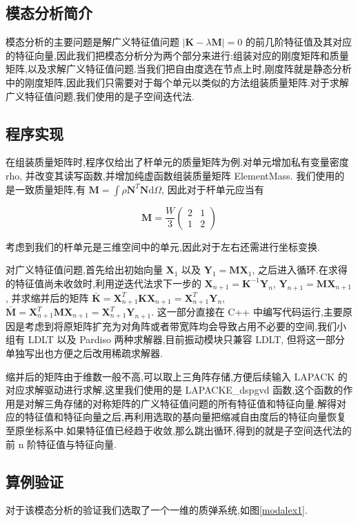 
\subsection{模态分析简介}
模态分析的主要问题是解广义特征值问题 $|\mathbf{K}-\lambda\mathbf{M}|=0$ 的前几阶特征值及其对应的特征向量,因此我们把模态分析分为两个部分来进行:组装对应的刚度矩阵和质量矩阵,以及求解广义特征值问题.当我们把自由度选在节点上时,刚度阵就是静态分析中的刚度矩阵,因此我们只需要对于每个单元以类似的方法组装质量矩阵.对于求解广义特征值问题,我们使用的是子空间迭代法.
\subsection{程序实现}
在组装质量矩阵时,程序仅给出了杆单元的质量矩阵为例.对单元增加私有变量密度 rho, 并改变其读写函数,并增加纯虚函数组装质量矩阵 ElementMass. 我们使用的是一致质量矩阵,有 $\mathbf{M}=\int\rho\mathbf{N}^T\mathbf{N}\mathrm{d}\Omega$, 因此对于杆单元应当有

\[
\mathbf{M}=\frac{W}{3}\left(\begin{array}{cc} 2&1\\1&2 \end{array} \right)
\]

考虑到我们的杆单元是三维空间中的单元,因此对于左右还需进行坐标变换.

对广义特征值问题,首先给出初始向量 $\mathbf{X}_1$ 以及 $\mathbf{Y}_1=\mathbf{M}\mathbf{X}_1$, 之后进入循环.在求得的特征值尚未收敛时,利用逆迭代法求下一步的 $\mathbf{X}_{n+1}=\mathbf{K}^{-1}\mathbf{Y}_n$, $\mathbf{Y}_{n+1}=\mathbf{M}\mathbf{X}_{n+1}$, 并求缩并后的矩阵 $\bar{\mathbf{K}}=\mathbf{X}_{n+1}^T\mathbf{K}\mathbf{X}_{n+1}=\mathbf{X}_{n+1}^T\mathbf{Y}_n$,  $\bar{\mathbf{M}}=\mathbf{X}_{n+1}^T\mathbf{M}\mathbf{X}_{n+1}=\mathbf{X}_{n+1}^T\mathbf{Y}_{n+1}$. 这一部分直接在 C++ 中编写代码运行,主要原因是考虑到将原矩阵扩充为对角阵或者带宽阵均会导致占用不必要的空间,我们小组有 LDLT 以及 Pardiso 两种求解器,目前振动模块只兼容 LDLT, 但将这一部分单独写出也方便之后改用稀疏求解器.

缩并后的矩阵由于维数一般不高,可以取上三角阵存储,方便后续输入 LAPACK 的对应求解驱动进行求解,这里我们使用的是 LAPACKE\_dspgvd 函数,这个函数的作用是对解三角存储的对称矩阵的广义特征值问题的所有特征值和特征向量.解得对应的特征值和特征向量之后,再利用选取的基向量把缩减自由度后的特征向量恢复至原坐标系中.如果特征值已经趋于收敛,那么跳出循环,得到的就是子空间迭代法的前 n 阶特征值与特征向量.

\subsection{算例验证}
对于该模态分析的验证我们选取了一个一维的质弹系统,如图\ref{modalex1}.

